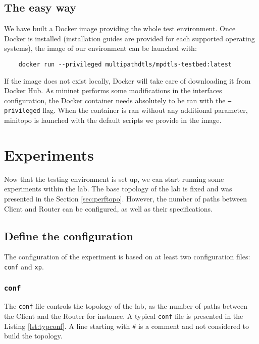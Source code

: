 \subsection{The easy way}
\label{sec:dock-install}

We have built a Docker \cite{docker} image providing the whole test environment. Once Docker is installed (installation guides are provided for each supported operating systems), the image of our environment can be launched with:

\begin{lstlisting}
    docker run --privileged multipathdtls/mpdtls-testbed:latest
\end{lstlisting}

If the image does not exist locally, Docker will take care of downloading it from Docker Hub. As mininet performs some modifications in the interfaces configuration, the Docker container needs absolutely to be ran with the \texttt{--privileged} flag. When the container is ran without any additional parameter, minitopo is launched with the default scripts we provide in the image.

\section{Experiments}

Now that the testing environment is set up, we can start running some experiments within the lab. The base topology of the lab is fixed and was presented in the Section \ref{sec:perftopo}. However, the number of paths between Client and Router can be configured, as well as their specifications.

\subsection{Define the configuration}

The configuration of the experiment is based on at least two configuration files: \texttt{conf} and \texttt{xp}.

\subsubsection{\texttt{conf}}

The \texttt{conf} file controls the topology of the lab, as the number of paths between the Client and the Router for instance. A typical \texttt{conf} file is presented in the Listing \ref{lst:typconf}. A line starting with \texttt{\#} is a comment and not considered to build the topology.

